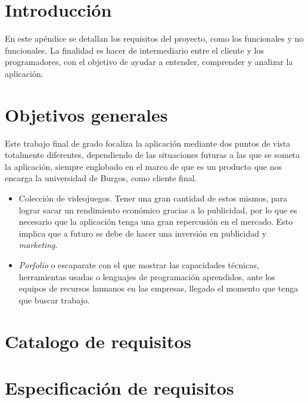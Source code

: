 
\section{Introducción}
En este apéndice se detallan los requisitos del proyecto, como los funcionales y no funcionales. La finalidad es hacer de intermediario entre el cliente y los programadores, con el objetivo de ayudar a entender, comprender y analizar la aplicación. 

\section{Objetivos generales}
Este trabajo final de grado focaliza la aplicación mediante dos puntos de vista totalmente diferentes, dependiendo de las situaciones futuras a las que se someta la aplicación, siempre englobado en el marco de que es un producto que nos encarga la universidad de Burgos, como cliente final.

\begin{itemize}
	\item Colección de videojuegos. Tener una gran cantidad de estos mismos, para lograr sacar un rendimiento económico gracias a lo publicidad, por lo que es necesario que la aplicación tenga una gran repercusión en el mercado. Esto implica que a futuro se debe de hacer una inversión en publicidad y \emph{marketing}.
	\item \emph{Porfolio} \cite{wiki:portafolio} o escaparate con el que mostrar las capacidades técnicas, herramientas usadas o lenguajes de programación aprendidos, ante los equipos de recursos humanos en las empresas, llegado el momento que tenga que buscar trabajo. 
\end{itemize}

\section{Catalogo de requisitos}

\section{Especificación de requisitos}


